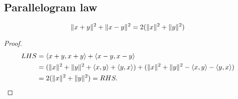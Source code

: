 \subsection{Parallelogram law}
\[\lVert x+y \rVert^2 + \lVert x-y \rVert^2 = 2(\lVert x \rVert^2 + \lVert y \rVert^2)\]

\begin{proof}
	\begin{align*}
		LHS &= \langle x+y, x+y \rangle + \langle x-y, x-y \rangle \\
		&= (\lVert x \rVert^2 + \lVert y \rVert^2 + \langle x, y \rangle + \langle y, x \rangle) + (\lVert x \rVert^2 + \lVert y \rVert^2 - \langle x, y \rangle - \langle y, x \rangle) \\
		&= 2(\lVert x \rVert^2 + \lVert y \rVert^2) = RHS.
	\end{align*}
\end{proof}